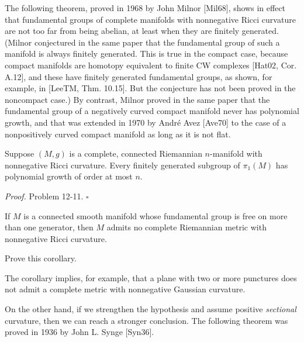 The following theorem, proved in 1968 by John Milnor [Mil68], shows in effect that fundamental groups of complete manifolds with nonnegative Ricci curvature are not too far from being abelian, at least when they are finitely generated. (Milnor conjectured in the same paper that the fundamental group of such a manifold is always finitely generated. This is true in the compact case, because compact manifolds are homotopy equivalent to finite CW complexes [Hat02, Cor. A.12], and these have finitely generated fundamental groups, as shown, for example, in [LeeTM, Thm. 10.15]. But the conjecture has not been proved in the noncompact case.) By contrast, Milnor proved in the same paper that the fundamental group of a negatively curved compact manifold never has polynomial growth, and that was extended in 1970 by André Avez [Ave70] to the case of a nonpositively curved compact manifold as long as it is not flat.

\begin{theorem}[Milnor]
\label{thm:milnor-polynomial-growth}
Suppose $(M, g)$ is a complete, connected Riemannian $n$-manifold with nonnegative Ricci curvature. Every finitely generated subgroup of $\pi_1(M)$ has polynomial growth of order at most $n$.
\end{theorem}

\noindent\textit{Proof.} Problem 12-11. \hspace*{\fill} $\square$

\begin{corollary}
\label{cor:free-fund-group-no-ric-metric}
If $M$ is a connected smooth manifold whose fundamental group is free on more than one generator, then $M$ admits no complete Riemannian metric with nonnegative Ricci curvature.
\end{corollary}

\begin{exercise}
\label{exer:prove-corollary-12-30}
Prove this corollary.
\end{exercise}

The corollary implies, for example, that a plane with two or more punctures does not admit a complete metric with nonnegative Gaussian curvature.

On the other hand, if we strengthen the hypothesis and assume positive \textit{sectional} curvature, then we can reach a stronger conclusion. The following theorem was proved in 1936 by John L. Synge [Syn36].

